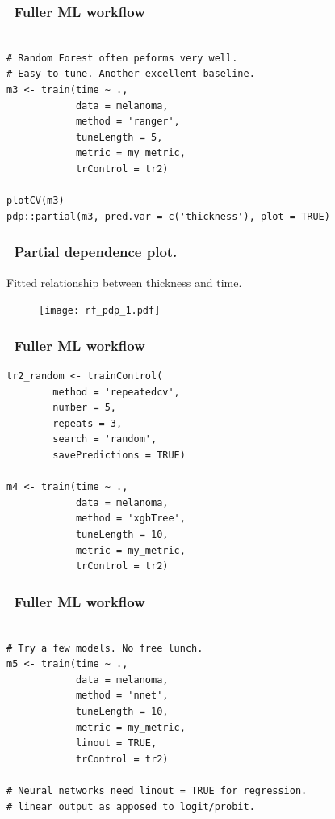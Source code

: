 \documentclass[handout, aspectratio = 169]{beamer}
\begin{document}
\begin{frame}[fragile]
\frametitle{\insertframenumber~Fuller ML workflow}
\begin{Verbatim}

# Random Forest often peforms very well.
# Easy to tune. Another excellent baseline.
m3 <- train(time ~ ., 
            data = melanoma,
            method = 'ranger',
            tuneLength = 5,
            metric = my_metric,
            trControl = tr2)

plotCV(m3)
pdp::partial(m3, pred.var = c('thickness'), plot = TRUE)

\end{Verbatim}

\end{frame} 


\begin{frame}
\frametitle{\insertframenumber~Partial dependence plot.}
\vspace{2mm}
Fitted relationship between thickness and time.
\begin{figure}
    \texttt{[image: rf\_pdp\_1.pdf]}

\end{figure} 

\end{frame} 



\begin{frame}[fragile]
\frametitle{\insertframenumber~Fuller ML workflow}
\vspace{1mm}
\begin{Verbatim}
tr2_random <- trainControl(
        method = 'repeatedcv',
        number = 5,
        repeats = 3, 
        search = 'random',
        savePredictions = TRUE)

m4 <- train(time ~ ., 
            data = melanoma,
            method = 'xgbTree',
            tuneLength = 10,
            metric = my_metric,
            trControl = tr2)

\end{Verbatim}

\end{frame} 


\begin{frame}[fragile]
\frametitle{\insertframenumber~Fuller ML workflow}
\begin{Verbatim}

# Try a few models. No free lunch.
m5 <- train(time ~ ., 
            data = melanoma,
            method = 'nnet',
            tuneLength = 10,
            metric = my_metric,
            linout = TRUE,
            trControl = tr2)

# Neural networks need linout = TRUE for regression.
# linear output as apposed to logit/probit.

\end{Verbatim}

\end{frame} 
\end{document}
